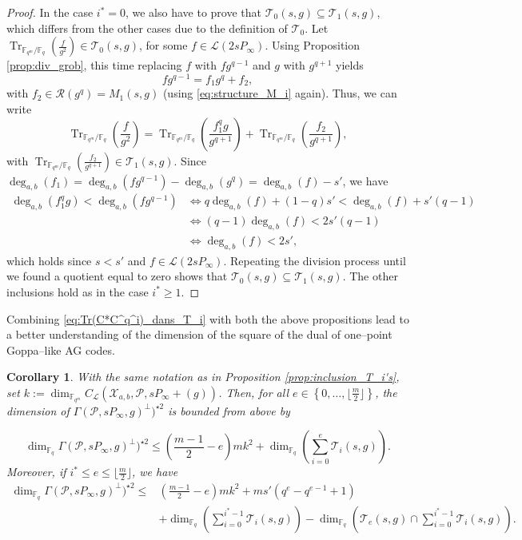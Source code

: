 \documentclass[a4paper]{amsart}
\newtheorem{coro}[thm]{Corollary}
\theoremstyle{definition}
\theoremstyle{remark}
\newcommand{\calP}{\mathcal{P}}
\newcommand{\calL}{\mathcal{L}}
\newcommand{\calR}{\mathcal{R}}
\newcommand{\calT}{\mathcal{T}}
\newcommand{\calX}{\mathcal{X}}
\newcommand{\fqm}{\mathbb{F}_{q^m}}
\newcommand{\fq}{\mathbb{F}_{q}}
\newcommand{\Tr}[1]{\operatorname{Tr}_{\mathbb{F}_{q^m}/\fq}\left(#1\right)}
\newcommand{\set}[1]{\left\{#1\right\}}
\newcommand{\degab}[1]{\deg_{a,b}\left(#1\right)}
\begin{document}
\begin{proof}
In the case $i^*=0$, we also have to prove that $\calT_0(s,g) \subseteq \calT_1(s,g)$, which differs from the other cases due to the definition of $\calT_0$. Let $\Tr{\frac{f}{g^2}} \in \calT_0(s,g)$, for some $f \in \calL(2sP_\infty)$. Using Proposition \ref{prop:div_grob}, this time replacing $f$ with $fg^{q-1}$ and $g$ with $g^{q+1}$ yields
$$fg^{q-1} = f_1g^q + f_2,$$ with $f_2 \in \calR(g^q) = M_1(s,g)$ (using \eqref{eq:structure_M_i} again).
Thus, we can write
    $$ \Tr{\frac{f}{g^2}} = \Tr{\frac{f_1^qg}{g^{q+1}}}  + \Tr{\frac{f_2}{g^{q+1}}}, $$
with $\Tr{\frac{f_2}{g^{q+1}}} \in \calT_1(s,g)$. Since $\degab{f_1} = \degab{fg^{q-1}} - \degab{g^q} = \degab{f}-s'$, we have 
\begin{align*}
     \degab{f_1^qg} < \degab{fg^{q-1}} & \iff q\degab{f} +(1-q)s' < \degab{f} + s'(q-1)\\
                                               & \iff (q-1)\degab{f} < 2s'(q-1)\\
                                               & \iff \degab{f} < 2s',
\end{align*}
which holds since $s<s'$ and $f \in \calL(2sP_\infty)$. Repeating the division process until we found a quotient equal to zero shows that $\calT_0(s,g) \subseteq \calT_1(s,g)$. The other inclusions hold as in the case $i^* \geq 1$.
\end{proof}
Combining \eqref{eq:Tr(C*C^q^i)_dans_T_i} with both the above propositions lead to a better understanding of the dimension of the square of the dual of one--point Goppa--like AG codes. 
\begin{coro} \label{coro:folklore_upper_bound}
 With the same notation as in Proposition \ref{prop:inclusion_T_i's}, set $k:=\dim_{\fqm}C_{\calL}(\calX_{a,b},\calP,sP_\infty+(g))$.
 Then, for all $e \in \set{0,\dots,\lfloor \frac{m}{2} \rfloor}$, the dimension of $\Gamma(\calP,sP_\infty,g)^{\perp})^{\star 2}$ is bounded from above by
 
\[\dim_{\fq} \Gamma(\calP,sP_\infty,g)^{\perp})^{\star 2} \leq   \left(\frac{m-1}{2}-e\right)mk^2+\dim_{\fq}\left(\sum\limits_{i=0}^e \calT_i(s,g) \right). \]
 Moreover, if $i^* \leq e \leq \lfloor \frac{m}{2} \rfloor$, we have 
 \begin{align*}
  \dim_{\fq} \Gamma(\calP,sP_\infty,g)^{\perp})^{\star 2} \leq   & \left(\frac{m-1}{2}-e\right)mk^2 + ms'(q^e-q^{e-1}+1) \\
  & + \dim_{\fq}\left(\sum\limits_{i=0}^{i^*-1} \calT_i(s,g)\right) - \dim_{\fq} \left( \calT_e(s,g) \cap   \sum\limits_{i=0}^{i^*-1} \calT_i(s,g)\right).
 \end{align*}

\end{coro}
\end{document}
